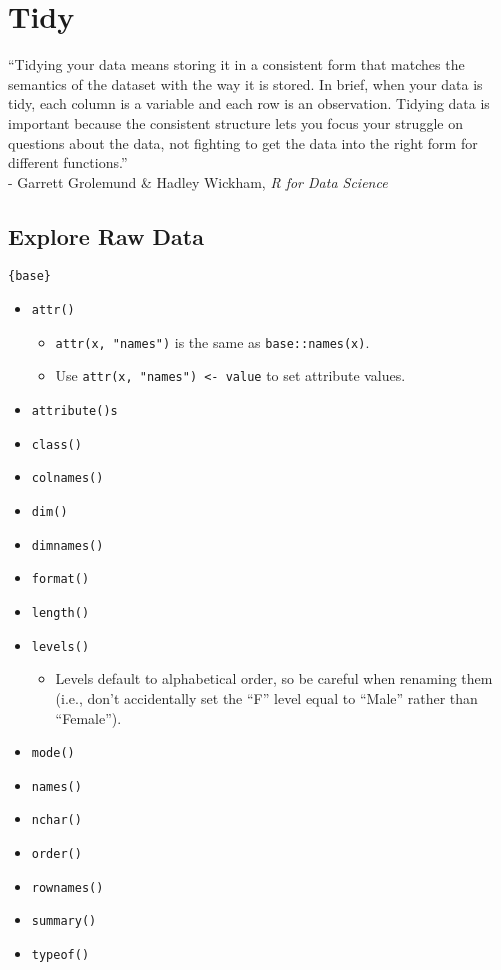 \documentclass[
]{book}
\providecommand{\tightlist}{%
  \setlength{\itemsep}{0pt}\setlength{\parskip}{0pt}}
\begin{document}
\hypertarget{tidy}{%
\chapter{Tidy}\label{tidy}}

``Tidying your data means storing it in a consistent form that matches the semantics of the dataset with the way it is stored. In brief, when your data is tidy, each column is a variable and each row is an observation. Tidying data is important because the consistent structure lets you focus your struggle on questions about the data, not fighting to get the data into the right form for different functions.''\\
- Garrett Grolemund \& Hadley Wickham, \emph{R for Data Science}

\hypertarget{explore-raw-data}{%
\section{Explore Raw Data}\label{explore-raw-data}}

\texttt{\{base\}}

\begin{itemize}
\tightlist
\item
  \texttt{attr()}

  \begin{itemize}
  \tightlist
  \item
    \texttt{attr(x,\ "names")} is the same as \texttt{base::names(x)}.
  \item
    Use \texttt{attr(x,\ "names")\ \textless{}-\ value} to set attribute values.
  \end{itemize}
\item
  \texttt{attribute()s}
\item
  \texttt{class()}
\item
  \texttt{colnames()}
\item
  \texttt{dim()}
\item
  \texttt{dimnames()}
\item
  \texttt{format()}
\item
  \texttt{length()}
\item
  \texttt{levels()}

  \begin{itemize}
  \tightlist
  \item
    Levels default to alphabetical order, so be careful when renaming them (i.e., don't accidentally set the ``F'' level equal to ``Male'' rather than ``Female'').
  \end{itemize}
\item
  \texttt{mode()}
\item
  \texttt{names()}
\item
  \texttt{nchar()}
\item
  \texttt{order()}
\item
  \texttt{rownames()}
\item
  \texttt{summary()}
\item
  \texttt{typeof()}
\end{itemize}
\end{document}
